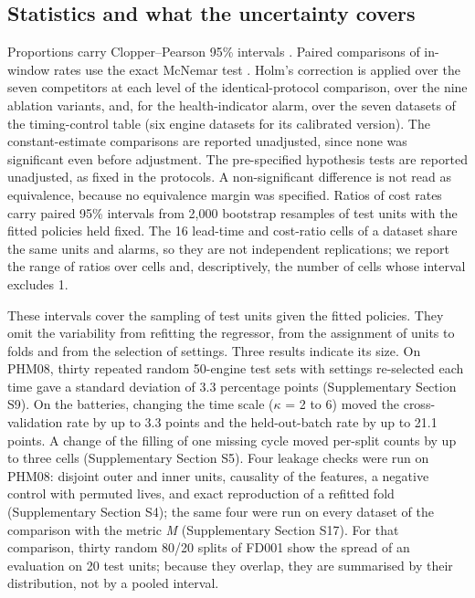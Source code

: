 \documentclass[a4paper,fleqn,doubleblind]{cas-dc}
\begin{document}
\subsection{Statistics and what the uncertainty covers}

Proportions carry Clopper--Pearson 95\% intervals \cite{clopper1934}. Paired comparisons of in-window rates use the exact McNemar test \cite{mcnemar1947}. Holm's correction \cite{holm1979} is applied over the seven competitors at each level of the identical-protocol comparison, over the nine ablation variants, and, for the health-indicator alarm, over the seven datasets of the timing-control table (six engine datasets for its calibrated version). The constant-estimate comparisons are reported unadjusted, since none was significant even before adjustment. The pre-specified hypothesis tests are reported unadjusted, as fixed in the protocols. A non-significant difference is not read as equivalence, because no equivalence margin was specified. Ratios of cost rates carry paired 95\% intervals from 2,000 bootstrap resamples of test units with the fitted policies held fixed. The 16 lead-time and cost-ratio cells of a dataset share the same units and alarms, so they are not independent replications; we report the range of ratios over cells and, descriptively, the number of cells whose interval excludes 1.

These intervals cover the sampling of test units given the fitted policies. They omit the variability from refitting the regressor, from the assignment of units to folds and from the selection of settings. Three results indicate its size. On PHM08, thirty repeated random 50-engine test sets with settings re-selected each time gave a standard deviation of 3.3 percentage points (Supplementary Section S9). On the batteries, changing the time scale ($\kappa$ = 2 to 6) moved the cross-validation rate by up to 3.3 points and the held-out-batch rate by up to 21.1 points. A change of the filling of one missing cycle moved per-split counts by up to three cells (Supplementary Section S5). Four leakage checks were run on PHM08: disjoint outer and inner units, causality of the features, a negative control with permuted lives, and exact reproduction of a refitted fold (Supplementary Section S4); the same four were run on every dataset of the comparison with the metric \textit{M} (Supplementary Section S17). For that comparison, thirty random 80/20 splits of FD001 show the spread of an evaluation on 20 test units; because they overlap, they are summarised by their distribution, not by a pooled interval.
\end{document}
